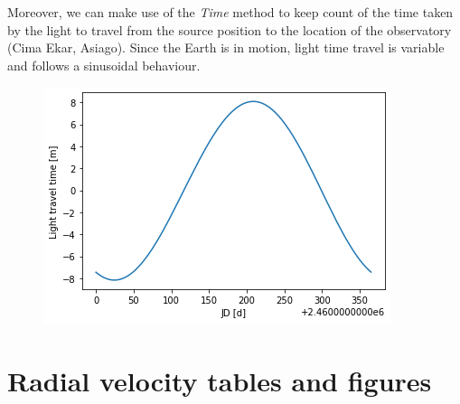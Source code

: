 \documentclass[a4paper,11pt,twocolumn]{article}
\begin{document}
Moreover, we can make use of the \textit{Time} method to keep count of the time 
taken by the light to travel from the source position to the location of the 
observatory (Cima Ekar, Asiago). Since the Earth is in motion, light time 
travel is variable and follows a sinusoidal behaviour.
\begin{figure}[H]
    \centering  
    \includegraphics[scale=0.7, angle=0]{../pictures/time_corr.png}
\end{figure}


\section{Radial velocity tables and figures}
\label{sect:app_C}
\end{document}
